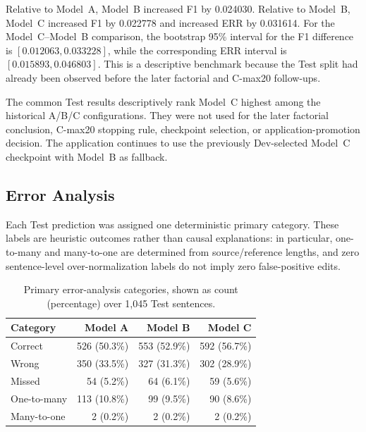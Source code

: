 \documentclass[11pt]{article}
\begin{document}
\begin{table}[t]
\centering
\caption{Common A/B/C results on 1,045 ViLexNorm Test sentences.}
\label{tab:benchmark-results}
\end{table}

Relative to Model~A, Model~B increased F1 by 0.024030. Relative to Model~B, Model~C increased F1 by 0.022778 and increased ERR by 0.031614. For the Model~C--Model~B comparison, the bootstrap 95\% interval for the F1 difference is $[0.012063, 0.033228]$, while the corresponding ERR interval is $[0.015893, 0.046803]$. This is a descriptive benchmark because the Test split had already been observed before the later factorial and C-max20 follow-ups.

The common Test results descriptively rank Model~C highest among the historical A/B/C configurations. They were not used for the later factorial conclusion, C-max20 stopping rule, checkpoint selection, or application-promotion decision. The application continues to use the previously Dev-selected Model~C checkpoint with Model~B as fallback.

\subsection{Error Analysis}

Each Test prediction was assigned one deterministic primary category. These labels are heuristic outcomes rather than causal explanations: in particular, one-to-many and many-to-one are determined from source/reference lengths, and zero sentence-level over-normalization labels do not imply zero false-positive edits.

\begin{table}[t]
\centering
\caption{Primary error-analysis categories, shown as count (percentage) over 1,045 Test sentences.}
\label{tab:error-categories}
\begin{tabular}{lrrr}
\toprule
Category & Model A & Model B & Model C \\
\midrule
Correct & 526 (50.3\%) & 553 (52.9\%) & 592 (56.7\%) \\
Wrong & 350 (33.5\%) & 327 (31.3\%) & 302 (28.9\%) \\
Missed & 54 (5.2\%) & 64 (6.1\%) & 59 (5.6\%) \\
One-to-many & 113 (10.8\%) & 99 (9.5\%) & 90 (8.6\%) \\
Many-to-one & 2 (0.2\%) & 2 (0.2\%) & 2 (0.2\%) \\
\bottomrule
\end{tabular}
\end{table}
\end{document}
